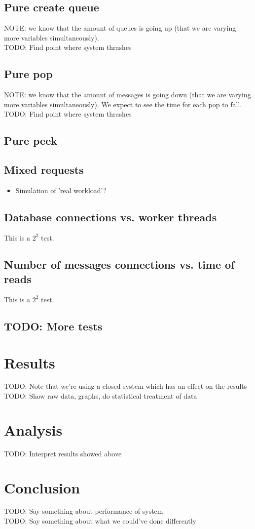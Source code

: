 \documentclass{article}
\begin{document}
        \subsection{Pure create queue}
            NOTE: we know that the amount of queues is going up (that we are varying more variables simultaneously).\\
            TODO: Find point where system thrashes

        \subsection{Pure pop}
            NOTE: we know that the amount of messages is going down (that we are varying more variables simultaneously). We expect to see the time for each pop to fall.\\
            TODO: Find point where system thrashes

        \subsection{Pure peek}

        \subsection{Mixed requests}
            \begin{itemize}
                \item Simulation of 'real workload'?
            \end{itemize}

        \subsection{Database connections vs. worker threads}
            This is a $2^2$ test.

        \subsection{Number of messages connections vs. time of reads}
            This is a $2^2$ test.

        \subsection{TODO: More tests}

    \section{Results}
        TODO: Note that we're using a closed system which has an effect on the results\\
        TODO: Show raw data, graphs, do statistical treatment of data

    \section{Analysis}
        TODO: Interpret results showed above

    \section{Conclusion}
        TODO: Say something about performance of system\\
        TODO: Say something about what we could've done differently
\end{document}

